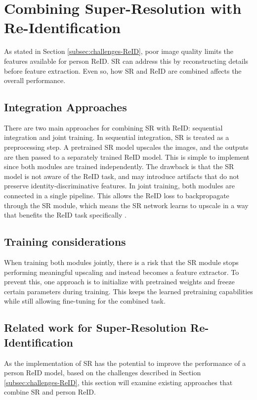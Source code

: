 \section{Combining Super-Resolution with Re-Identification}

As stated in Section \ref{subsec:challenges-ReID}, poor image quality limits the features available for person \acs{ReID}. \acs{SR} can address this by reconstructing details before feature extraction. Even so, how \acs{SR} and \acs{ReID} are combined affects the overall performance.

\subsection{Integration Approaches}

There are two main approaches for combining \acs{SR} with \acs{ReID}: sequential integration and joint training. In sequential integration, \acs{SR} is treated as a preprocessing step. A pretrained \acs{SR} model upscales the images, and the outputs are then passed to a separately trained \acs{ReID} model. This is simple to implement since both modules are trained independently. The drawback is that the \acs{SR} model is not aware of the \acs{ReID} task, and may introduce artifacts that do not preserve identity-discriminative\cite{APSR} features. In joint training, both modules are connected in a single pipeline. This allows the \acs{ReID} loss to backpropagate through the \acs{SR} module, which means the \acs{SR} network learns to upscale in a way that benefits the \acs{ReID} task specifically \cite{jiao2018sing,wang2018cascaded,zheng2022joint}.

\subsection{Training considerations}
When training both modules jointly, there is a risk that the \acs{SR} module stops performing meaningful upscaling and instead becomes a feature extractor. To prevent this, one approach is to initialize with pretrained weights and freeze certain parameters during training. This keeps the learned pretraining capabilities while still allowing fine-tuning for the combined task.

\subsection{Related work for Super-Resolution Re-Identification}\label{sec:superres-reid}
As the implementation of \acs{SR} has the potential to improve the performance of a person \acs{ReID} model, based on the challenges described in Section \ref{subsec:challenges-ReID}, this section will examine existing approaches that combine \acs{SR} and person \acs{ReID}.

